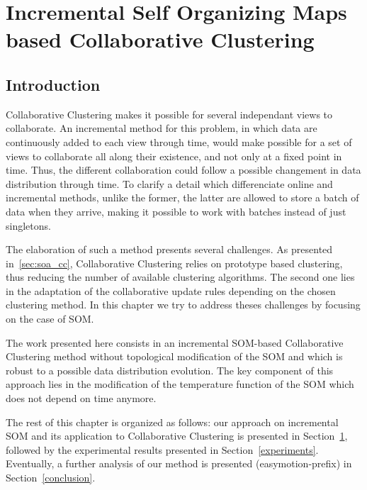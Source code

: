 	\chapter{Incremental Self Organizing Maps based Collaborative Clustering}
\label{ccisom}

\minitoc{}
\newpage

    \section{Introduction}

    Collaborative Clustering makes it possible for several independant views to collaborate. An incremental method for this problem, in which data are continuously added to each view through time, would make possible for a set of views to collaborate all along their existence, and not only at a fixed point in time. Thus, the different collaboration could follow a possible changement in data distribution through time. To clarify a detail which differenciate online and incremental methods, unlike the former, the latter are allowed to store a batch of data when they arrive, making it possible to work with batches instead of just singletons.
	
    The elaboration of such a method presents several challenges. As presented in~\ref{sec:soa_cc}, Collaborative Clustering relies on prototype based clustering, thus reducing the number of available clustering algorithms. The second one lies in the adaptation of the collaborative update rules depending on the chosen clustering method. In this chapter we try to address theses challenges by focusing on the case of SOM.\@
	
    The work presented here consists in an incremental SOM-based Collaborative Clustering method without topological modification of the SOM and which is robust to a possible data distribution evolution. The key component of this approach lies in the modification of the temperature function of the SOM which does not depend on time anymore.
	
    The rest of this chapter is organized as follows: our approach on incremental SOM and its application to Collaborative Clustering is presented in Section~\ref{ccisom}, followed by the experimental results presented in Section~\ref{experiments}. Eventually, a further analysis of our method is presented (easymotion-prefix) in Section~\ref{conclusion}.
	

